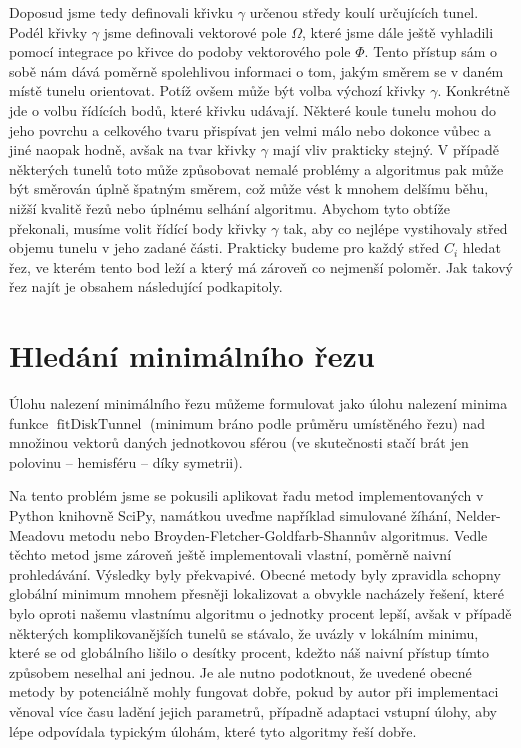 Doposud jsme tedy definovali křivku $ \gamma $ určenou středy koulí určujících
tunel. Podél křivky $ \gamma $ jsme definovali vektorové pole $ \Omega $, které
jsme dále ještě vyhladili pomocí integrace po křivce do podoby vektorového
pole $ \Phi $. Tento přístup sám o sobě nám dává poměrně spolehlivou informaci
o tom, jakým směrem se v daném místě tunelu orientovat. Potíž ovšem
může být volba výchozí křivky $ \gamma $. Konkrétně jde o volbu řídících bodů,
které křivku udávají. Některé koule tunelu mohou do jeho povrchu a celkového
tvaru přispívat jen velmi málo nebo dokonce vůbec a jiné naopak hodně, avšak na tvar
křivky $ \gamma $ mají vliv prakticky stejný. V případě některých tunelů
toto může způsobovat nemalé problémy a algoritmus pak může být směrován úplně
špatným směrem, což může vést k mnohem delšímu běhu, nižší kvalitě řezů nebo
úplnému selhání algoritmu. Abychom tyto obtíže překonali, musíme volit
řídící body křivky $ \gamma $ tak, aby co nejlépe vystihovaly střed objemu
tunelu v jeho zadané části. Prakticky budeme pro každý střed $ C_i $ hledat řez,
ve kterém tento bod leží a který má zároveň co nejmenší poloměr. Jak takový
řez najít je obsahem následující podkapitoly.






\section{Hledání minimálního řezu} \label{subsec:min_cut}
Úlohu nalezení minimálního řezu můžeme formulovat jako úlohu nalezení minima
funkce $ \operatorname{fitDiskTunnel} $ (minimum bráno podle průměru umístěného řezu)
nad množinou vektorů daných jednotkovou sférou (ve skutečnosti stačí brát
jen polovinu – hemisféru – díky symetrii).

Na tento problém jsme se pokusili aplikovat řadu metod implementovaných v Python
knihovně SciPy, namátkou uveďme například simulované žíhání, Nelder-Meadovu metodu
nebo Broyden-Fletcher-Goldfarb-Shannův algoritmus. Vedle těchto metod jsme zároveň
ještě implementovali vlastní, poměrně naivní prohledávání. Výsledky byly
překvapivé. Obecné metody byly zpravidla schopny globální minimum mnohem přesněji
lokalizovat a obvykle nacházely řešení, které bylo oproti našemu vlastnímu
algoritmu o jednotky procent lepší, avšak v případě některých komplikovanějších
tunelů se stávalo, že uvázly v lokálním minimu, které se od globálního lišilo
o desítky procent, kdežto náš naivní přístup tímto způsobem neselhal ani jednou.
Je ale nutno podotknout, že uvedené obecné metody by potenciálně mohly fungovat
dobře, pokud by autor při implementaci věnoval více času ladění jejich parametrů,
případně adaptaci vstupní úlohy, aby lépe odpovídala typickým úlohám, které tyto
algoritmy řeší dobře.

